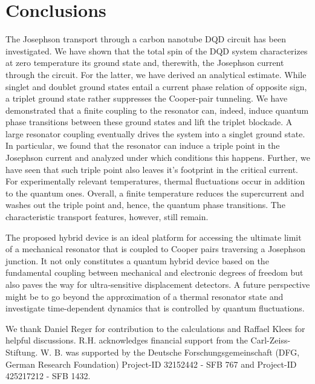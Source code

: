 \documentclass[aps,prb,twocolumn,superscriptaddress,amsmath,amssymb,longbibliography]{revtex4-1}
\begin{document}
	\section{Conclusions}
	The Josephson transport through a carbon nanotube DQD circuit has been investigated. We have shown that the total spin of the DQD system characterizes 
	at zero temperature its ground state and, therewith, the Josephson current through the circuit. For the latter, we have derived an analytical estimate. While singlet 
	and doublet ground states entail a current phase relation of opposite sign, a triplet ground state rather suppresses the Cooper-pair tunneling. We have demonstrated 
	that a finite coupling to the resonator can, indeed, induce quantum phase transitions between these ground states and lift the triplet blockade. A large resonator coupling 
	eventually drives the system into a singlet ground state. In particular, we found that the resonator can induce a triple point in the Josephson current and analyzed 
	under which conditions this happens. Further, we have seen that such triple point also leaves it's footprint in the critical current. For experimentally relevant temperatures, 
	thermal fluctuations occur in addition to the quantum ones. Overall, a finite temperature reduces the supercurrent and washes out the  triple point and, hence, the 
	quantum phase transitions. The characteristic transport features, however, still remain. 
	
	The proposed hybrid device is an ideal platform for accessing the ultimate limit of a mechanical resonator that is coupled to Cooper pairs traversing a 
	Josephson junction. It not only constitutes a quantum hybrid device based on the fundamental coupling between  mechanical and electronic degrees of freedom but also paves the way for ultra-sensitive displacement detectors. A future perspective might be to go beyond the approximation of a thermal resonator state and investigate time-dependent dynamics that is controlled by quantum fluctuations.
	
	
	\begin{acknowledgments}
		We thank Daniel Reger for contribution to the calculations and Raffael Klees for helpful discussions. R.H. acknowledges financial support from the Carl-Zeiss-Stiftung. 
		W. B. was supported by the Deutsche Forschungsgemeinschaft (DFG, German Research Foundation) Project-ID 32152442 - SFB 767 and Project-ID 425217212 - SFB 1432. 
	\end{acknowledgments}
	
	\appendix
\end{document}
